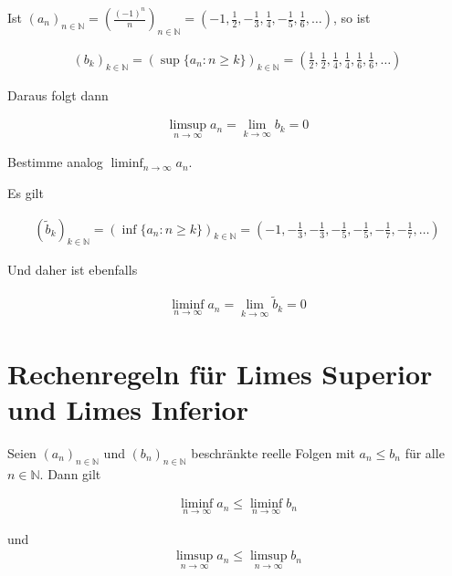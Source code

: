\documentclass[fontsize=9pt,
               parskip=half-,
               DIV=14,
               listof=chapterentry,
               tocflat]{scrbook}
\begin{document}
\begin{example*}
Ist $(a_{n})_{n\in \mathbb {N} }=({\tfrac {(-1)^{n}}{n}})_{n\in \mathbb {N} }=(-1,{\tfrac {1}{2}},-{\tfrac {1}{3}},{\tfrac {1}{4}},-{\tfrac {1}{5}},{\tfrac {1}{6}},\ldots )$, so ist

\begin{align*}
(b_{k})_{k\in \mathbb {N} }=(\sup\{a_{n}:n\geq k\})_{k\in \mathbb {N} }=({\tfrac {1}{2}},{\tfrac {1}{2}},{\tfrac {1}{4}},{\tfrac {1}{4}},{\tfrac {1}{6}},{\tfrac {1}{6}},\ldots )
\end{align*}

Daraus folgt dann

\begin{align*}
\limsup _{n\to \infty }a_{n}=\lim _{k\to \infty }b_{k}=0
\end{align*}

\end{example*}

\begin{mdframed}[style=semanticbox,frametitleaboveskip=3pt,innerbottommargin=3pt,frametitle={Verständnisaufgabe}]
Bestimme analog $\liminf _{n\to \infty }a_{n}$.

\end{mdframed}

\begin{answer*}
Es gilt

\begin{align*}
({\tilde {b}}_{k})_{k\in \mathbb {N} }=(\inf\{a_{n}:n\geq k\})_{k\in \mathbb {N} }=(-1,-{\tfrac {1}{3}},-{\tfrac {1}{3}},-{\tfrac {1}{5}},-{\tfrac {1}{5}},-{\tfrac {1}{7}},-{\tfrac {1}{7}},\ldots )
\end{align*}

Und daher ist ebenfalls

\begin{align*}
\liminf _{n\to \infty }a_{n}=\lim _{k\to \infty }{\tilde {b}}_{k}=0
\end{align*}

\end{answer*}

\section{Rechenregeln für Limes Superior und Limes Inferior}

\begin{theorem*}[Monotonieregel]
Seien $(a_{n})_{n\in \mathbb {N} }$ und $(b_{n})_{n\in \mathbb {N} }$ beschränkte reelle Folgen mit $a_{n}\leq b_{n}$ für alle $n\in \mathbb {N} $. Dann gilt

\begin{align*}
\liminf _{n\to \infty }a_{n}\leq \liminf _{n\to \infty }b_{n}
\end{align*}

 und \begin{align*}
\limsup _{n\to \infty }a_{n}\leq \limsup _{n\to \infty }b_{n}
\end{align*}

\end{theorem*}
\end{document}
